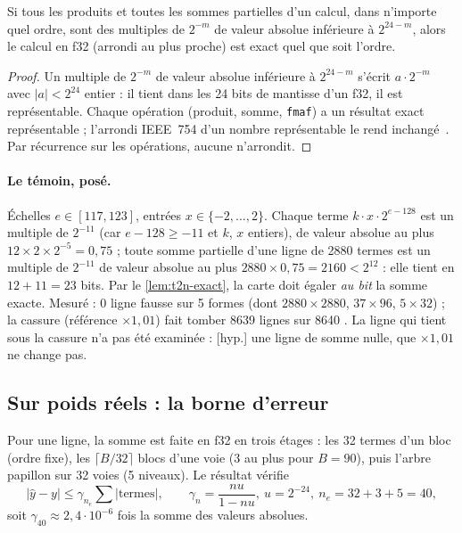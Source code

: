 \begin{lemme}\label{lem:t2n-exact}
Si tous les produits et toutes les sommes partielles d'un calcul, dans n'importe quel ordre, sont des multiples de $2^{-m}$ de valeur absolue inférieure à $2^{24 - m}$, alors le calcul en f32 (arrondi au plus proche) est exact quel que soit l'ordre.
\end{lemme}

\begin{proof}
Un multiple de $2^{-m}$ de valeur absolue inférieure à $2^{24-m}$ s'écrit $a \cdot 2^{-m}$ avec $|a| < 2^{24}$ entier : il tient dans les 24 bits de mantisse d'un f32, il est représentable. Chaque opération (produit, somme, \texttt{fmaf}) a un résultat exact représentable ; l'arrondi IEEE~754 d'un nombre représentable le rend inchangé~\cite{ieee754-2019}. Par récurrence sur les opérations, aucune n'arrondit.
\end{proof}

\paragraph{Le témoin, posé.} Échelles $e \in [117, 123]$, entrées $x \in \{-2, \ldots, 2\}$. Chaque terme $k \cdot x \cdot 2^{e - 128}$ est un multiple de $2^{-11}$ (car $e - 128 \ge -11$ et $k$, $x$ entiers), de valeur absolue au plus $12 \times 2 \times 2^{-5} = 0{,}75$ ; toute somme partielle d'une ligne de \num{2880} termes est un multiple de $2^{-11}$ de valeur absolue au plus $\num{2880} \times 0{,}75 = \num{2160} < 2^{12}$ \calc : elle tient en $12 + 11 = 23$ bits. Par le \cref{lem:t2n-exact}, la carte doit égaler \emph{au bit} la somme exacte. Mesuré : 0 ligne fausse sur 5 formes (dont $\num{2880} \times \num{2880}$, $37 \times 96$, $5 \times 32$) ; la cassure (référence $\times 1{,}01$) fait tomber \num{8639} lignes sur \num{8640} \mes. La ligne qui tient sous la cassure n'a pas été examinée : [hyp.] une ligne de somme nulle, que $\times 1{,}01$ ne change pas.

\subsection{Sur poids réels : la borne d'erreur}

\begin{proposition}\label{prop:t2n-borne-gemv}
Pour une ligne, la somme est faite en f32 en trois étages : les 32 termes d'un bloc (ordre fixe), les $\lceil B/32 \rceil$ blocs d'une voie (3 au plus pour $B = 90$), puis l'arbre papillon sur 32 voies (5 niveaux). Le résultat vérifie
\[
|\hat y - y| \le \gamma_{n_e} \sum |\text{termes}|, \qquad \gamma_n = \frac{n u}{1 - n u},\ u = 2^{-24},\ n_e = 32 + 3 + 5 = 40,
\]
soit $\gamma_{40} \approx 2{,}4\cdot10^{-6}$ fois la somme des valeurs absolues.
\end{proposition}

